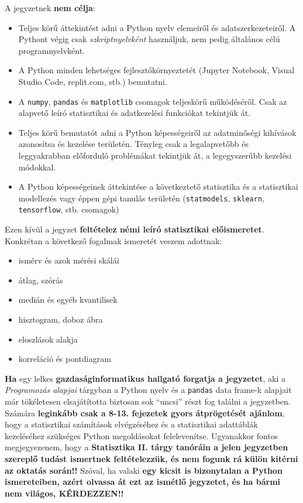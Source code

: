 \documentclass[
]{book}
\providecommand{\tightlist}{%
  \setlength{\itemsep}{0pt}\setlength{\parskip}{0pt}}
\begin{document}
A jegyzetnek \textbf{nem célja}:

\begin{itemize}
\tightlist
\item
  Teljes körű áttekintést adni a Python nyelv elemeiről és adatszerkezeteiről. A Pythont végig csak \emph{szkriptnyelvként} használjuk, nem pedig általános célú programnyelvként.
\item
  A Python minden lehetséges fejlesztőkörnyeztetét (Jupyter Notebook, Visual Studio Code, replit.com, stb.) bemutatni.
\item
  A \texttt{numpy}, \texttt{pandas} és \texttt{matplotlib} csomagok teljeskörű működéséről. Csak az alapvető leíró statisztikai és adatkezelési funkciókat tekintjük át.
\item
  Teljes körű bemutatót adni a Python képességeiről az adatminőségi kihívások azonosítsa és kezelése területén. Tényleg csak a legalapvetőbb és leggyakrabban előforduló problémákat tekintjük át, a legegyszerűbb kezelési módokkal.
\item
  A Python képességeinek áttekintése a következtető statisztika és a statisztikai modellezés vagy éppen gépi tanulás területén (\texttt{statmodels}, \texttt{sklearn}, \texttt{tensorflow}, stb. csomagok)
\end{itemize}

Ezen kívül a jegyzet \textbf{feltételez némi leíró statisztikai előismeretet}. Konkrétan a következő fogalmak ismeretét veszem adottnak:

\begin{itemize}
\tightlist
\item
  ismérv és azok mérési skálái
\item
  átlag, szórás
\item
  medián és egyéb kvantilisek
\item
  hisztogram, doboz ábra
\item
  eloszlások alakja
\item
  korreláció és pontdiagram
\end{itemize}

\textbf{Ha} egy lelkes \textbf{gazdaságinformatikus hallgató forgatja a jegyzetet}, aki a \emph{Programozás alapjai} tárgyban a Python nyelv és a \texttt{pandas} data frame-k alapjait már tökéletesen elsajátította biztosan sok ``uncsi'' részt fog találni a jegyzetben. Számára \textbf{leginkább csak a 8-13. fejezetek gyors átprögetését ajánlom}, hogy a statisztikai számítások elvégzéséhez és a statisztikai adattáblák kezeléséhez szükséges Python megoldásokat felelevenítse.
Ugyanakkor fontos megjegyezenem, hogy a \textbf{Statisztika II. tárgy tanóráin a jelen jegyzetben szereplő tudást ismertnek feltételezzük, és nem fogunk rá külön kitérni az oktatás során!!} Szóval, ha valaki \textbf{egy kicsit is bizonytalan a Python ismereteiben, azért olvassa át ezt az ismétlő jegyzetet, és ha bármi nem világos, KÉRDEZZEN!!}
\end{document}

